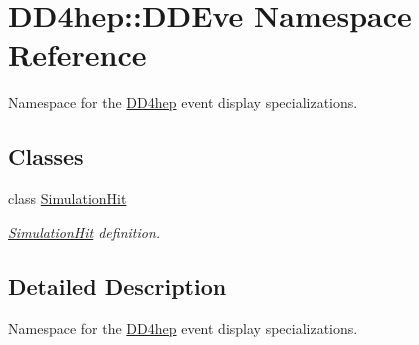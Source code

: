 \hypertarget{namespace_d_d4hep_1_1_d_d_eve}{
\section{DD4hep::DDEve Namespace Reference}
\label{namespace_d_d4hep_1_1_d_d_eve}
}


Namespace for the \hyperlink{namespace_d_d4hep}{DD4hep} event display specializations.  
\subsection*{Classes}
\begin{DoxyCompactItemize}
\item 
class \hyperlink{class_d_d4hep_1_1_d_d_eve_1_1_simulation_hit}{SimulationHit}
\begin{DoxyCompactList}\small\item\em \hyperlink{class_d_d4hep_1_1_d_d_eve_1_1_simulation_hit}{SimulationHit} definition. \item\end{DoxyCompactList}\end{DoxyCompactItemize}


\subsection{Detailed Description}
Namespace for the \hyperlink{namespace_d_d4hep}{DD4hep} event display specializations. 